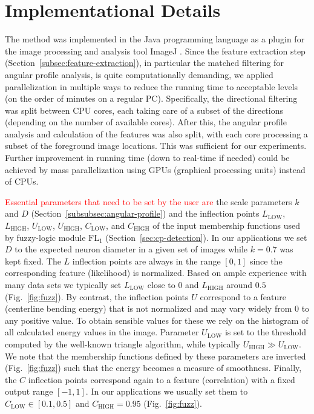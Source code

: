 \documentclass[twocolumn,natbib]{svjour3}
\newcommand{\marked}[1]{\textcolor{red}{#1}}
\begin{document}
\section{Implementational Details}
\label{sec:implementation-details}
The method was implemented in the Java programming language as a plugin for the image processing and analysis tool ImageJ \citep{abramoff2004image,Schneider-2012}. Since the feature extraction step (Section~\ref{subsec:feature-extraction}), in particular the matched filtering for  angular profile analysis, is quite computationally demanding, we applied parallelization in multiple ways to reduce the running time to acceptable levels (on the order of minutes on a regular PC). Specifically, the directional filtering was split between CPU cores, each taking care of a subset of the directions (depending on the number of available cores). After this, the angular profile analysis and calculation of the features was also split, with each core processing a subset of the foreground image locations. This was sufficient for our experiments. Further improvement in running time (down to real-time if needed) could be achieved by mass parallelization using GPUs (graphical processing units) instead of CPUs.

\marked{Essential parameters that need to be set by the user are} the scale parameters $k$ and $D$ (Section~\ref{subsubsec:angular-profile}) and the inflection points $L_{\mathrm{LOW}}$, $L_{\mathrm{HIGH}}$, $U_{\mathrm{LOW}}$, $U_{\mathrm{HIGH}}$, $C_{\mathrm{LOW}}$, and $C_{\mathrm{HIGH}}$ of the input membership functions used by fuzzy-logic module $\textrm{FL}_{1}$ (Section~\ref{sec:cp-detection}). In our applications we set $D$ to the expected neuron diameter in a given set of images while $k=0.7$ was kept fixed. The $L$ inflection points are always in the range $[0,1]$ since the corresponding feature (likelihood) is normalized. Based on ample experience with many data sets we typically set $L_{\mathrm{LOW}}$ close to 0 and $L_{\mathrm{HIGH}}$ around $0.5$ (Fig.~\ref{fig:fuzz}). By contrast, the inflection points $U$ correspond to a feature (centerline bending energy) that is not normalized and may vary widely from $0$ to any positive value. To obtain sensible values for these we rely on the histogram of all calculated energy values in the image. Parameter $U_{\mathrm{LOW}}$ is set to the threshold computed by the well-known triangle algorithm, while typically $U_{\mathrm{HIGH}}\gg U_{\mathrm{LOW}}$. We note that the membership functions defined by these parameters are inverted (Fig.~\ref{fig:fuzz}) such that the energy becomes a measure of smoothness. Finally, the $C$ inflection points correspond again to a feature (correlation) with a fixed output range $[-1,1]$. In our applications we usually set them to $C_{\mathrm{LOW}}\in[0.1,0.5]$ and $C_{\mathrm{HIGH}}=0.95$  (Fig.~\ref{fig:fuzz}).
\end{document}
